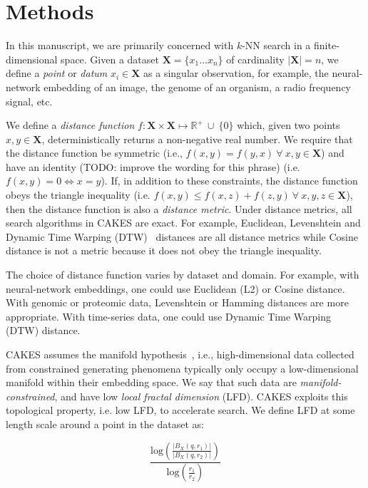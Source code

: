 \section{Methods}
\label{sec:methods}

In this manuscript, we are primarily concerned with $k$-NN search in a finite-dimensional space.
Given a dataset $\textbf{X} = \{x_1 \dots x_n\}$ of cardinality $|\textbf{X}| = n$, we define a \emph{point} or \emph{datum} $x_i \in \textbf{X}$ as a singular observation, for example, the neural-network embedding of an image, the genome of an organism, a radio frequency signal, etc.

We define a \emph{distance function} $f : \textbf{X} \times \textbf{X} \mapsto \mathbb{R}^+ \ \cup \ \{0\}$ which, given two points $x, y \in \textbf{X}$, deterministically returns a non-negative real number.
We require that the distance function be symmetric (i.e., $f(x, y) = f(y, x) \ \forall \ x, y \in \textbf{X}$) and {\color{red} have an identity (TODO: improve the wording for this phrase)} (i.e. $f(x, y) = 0 \iff x = y$).
If, in addition to these constraints, the distance function obeys the triangle inequality (i.e. $f(x, y) \leq f(x, z) + f(z, y) \ \forall \ x, y, z \in \textbf{X}$), then the distance function is also a \emph{distance metric}.
Under distance metrics, all search algorithms in CAKES are exact.
For example, Euclidean, Levenshtein and Dynamic Time Warping (DTW)~\cite{muller2007dynamic} distances are all distance metrics while Cosine distance is not a metric because it does not obey the triangle inequality.

The choice of distance function varies by dataset and domain.
For example, with neural-network embeddings, one could use Euclidean (L2) or Cosine distance.
With genomic or proteomic data, Levenshtein or Hamming distances are more appropriate.
With time-series data, one could use Dynamic Time Warping (DTW) distance.

CAKES assumes the manifold hypothesis~\cite{fefferman2016testing}, i.e., high-dimensional data collected from constrained generating phenomena typically only occupy a low-dimensional manifold within their embedding space.
We say that such data are \emph{manifold-constrained}, and have low \emph{local fractal dimension} (LFD).
CAKES exploits this topological property, i.e. low LFD, to accelerate search.
We define LFD at some length scale around a point in the dataset as:

\begin{equation}
    \frac{\text{log} \left( \frac{|B_X(q, r_1)|}{|B_X(q, r_2)|} \right) }{\text{log} \left( \frac{r_1}{r_2} \right) }
    \label{eq:methods:lfd-original}
\end{equation}

